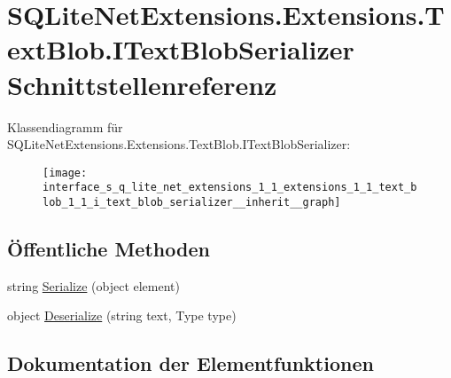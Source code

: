 \hypertarget{interface_s_q_lite_net_extensions_1_1_extensions_1_1_text_blob_1_1_i_text_blob_serializer}{}\section{S\+Q\+Lite\+Net\+Extensions.\+Extensions.\+Text\+Blob.\+I\+Text\+Blob\+Serializer Schnittstellenreferenz}
\label{interface_s_q_lite_net_extensions_1_1_extensions_1_1_text_blob_1_1_i_text_blob_serializer}


Klassendiagramm für S\+Q\+Lite\+Net\+Extensions.\+Extensions.\+Text\+Blob.\+I\+Text\+Blob\+Serializer\+:\nopagebreak
\begin{figure}[H]
\begin{center}
\leavevmode
\texttt{[image: interface\_s\_q\_lite\_net\_extensions\_1\_1\_extensions\_1\_1\_text\_blob\_1\_1\_i\_text\_blob\_serializer\_\_inherit\_\_graph]}
\end{center}
\end{figure}
\subsection*{Öffentliche Methoden}
\begin{DoxyCompactItemize}
\item 
string \mbox{\hyperlink{interface_s_q_lite_net_extensions_1_1_extensions_1_1_text_blob_1_1_i_text_blob_serializer_a3e0a51dfda28489d8ad53c2e9ee8ed57}{Serialize}} (object element)
\item 
object \mbox{\hyperlink{interface_s_q_lite_net_extensions_1_1_extensions_1_1_text_blob_1_1_i_text_blob_serializer_a4213bacb6d2dee3ef1e4d1950c01c57e}{Deserialize}} (string text, Type type)
\end{DoxyCompactItemize}


\subsection{Dokumentation der Elementfunktionen}
\mbox{\label{interface_s_q_lite_net_extensions_1_1_extensions_1_1_text_blob_1_1_i_text_blob_serializer_a4213bacb6d2dee3ef1e4d1950c01c57e}} 
